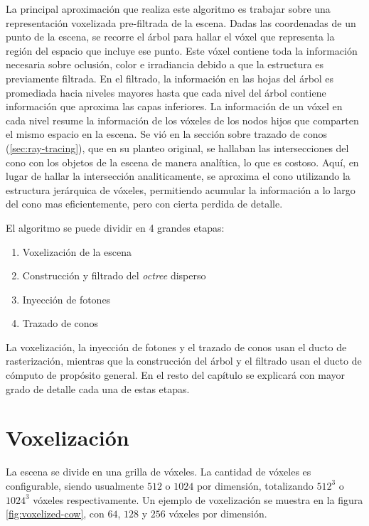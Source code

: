 La principal aproximación que realiza este algoritmo es trabajar sobre una representación voxelizada pre-filtrada de la escena.
Dadas las coordenadas de un punto de la escena, se recorre el árbol para hallar el vóxel que representa la región del espacio que incluye ese punto.
Este vóxel contiene toda la información necesaria sobre oclusión, color e irradiancia debido a que la estructura es previamente filtrada.
En el filtrado, la información en las hojas del árbol es promediada hacia niveles mayores hasta que cada nivel del árbol contiene información que aproxima las capas inferiores.
La información de un vóxel en cada nivel resume la información de los vóxeles de los nodos hijos que comparten el mismo espacio en la escena.
Se vió en la sección sobre trazado de conos (\ref{sec:ray-tracing}), que en su planteo original, se hallaban las intersecciones del cono con los objetos de la escena de manera analítica, lo que es costoso.
Aquí, en lugar de hallar la intersección analiticamente, se aproxima el cono utilizando la estructura jerárquica de vóxeles, permitiendo acumular la información a lo largo del cono mas eficientemente, pero con cierta perdida de detalle.

El algoritmo se puede dividir en 4 grandes etapas:

\begin{enumerate}
    \item Voxelización de la escena
    \item Construcción y filtrado del \textit{octree} disperso
    \item Inyección de fotones
    \item Trazado de conos
\end{enumerate}

La voxelización, la inyección de fotones y el trazado de conos usan el ducto de rasterización, mientras que la construcción del árbol y el filtrado usan el ducto de cómputo de propósito general.
En el resto del capítulo se explicará con mayor grado de detalle cada una de estas etapas.

\section{Voxelización}\label{sec:voxelization}

La escena se divide en una grilla de vóxeles.
La cantidad de vóxeles es configurable, siendo usualmente $512$ o $1024$ por dimensión, totalizando $512^3$ o $1024^3$ vóxeles respectivamente.
Un ejemplo de voxelización se muestra en la figura \ref{fig:voxelized-cow}, con $64$, $128$ y $256$ vóxeles por dimensión.

